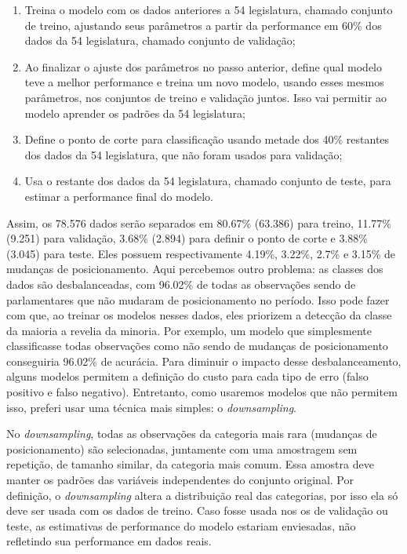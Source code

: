 \documentclass[a4paper,titlepage]{ppgi}\usepackage[]{graphicx}\usepackage[]{color}
\begin{document}
\begin{enumerate}
\item Treina o modelo com os dados anteriores a 54\textordfeminine{}
legislatura, chamado conjunto de treino, ajustando seus parâmetros a partir
da performance em 60\% dos dados da 54\textordfeminine{} legislatura, chamado
conjunto de validação;
\item Ao finalizar o ajuste dos parâmetros no passo anterior, define qual
modelo teve a melhor performance e treina um novo modelo, usando esses mesmos
parâmetros, nos conjuntos de treino e validação juntos. Isso vai permitir ao
modelo aprender os padrões da 54\textordfeminine{} legislatura;
\item Define o ponto de corte para classificação usando metade dos 40\%
restantes dos dados da 54\textordfeminine{} legislatura, que não foram usados
para validação;
\item Usa o restante dos dados da 54\textordfeminine{} legislatura, chamado
conjunto de teste, para estimar a performance final do modelo.
\end{enumerate}

Assim, os 78.576 dados serão separados em
80.67\%
(63.386) para treino,
11.77\%
(9.251) para validação,
3.68\%
(2.894) para definir o ponto de corte e
3.88\% (3.045) para
teste. Eles possuem respectivamente
4.19\%,
3.22\%,
2.7\% e
3.15\% de mudanças de posicionamento.
Aqui percebemos outro problema: as classes dos dados são desbalanceadas, com
96.02\% de todas as observações sendo de
parlamentares que não mudaram de posicionamento no período. Isso pode fazer com
que, ao treinar os modelos nesses dados, eles priorizem a detecção da classe da
maioria a revelia da minoria. Por exemplo, um modelo que simplesmente
classificasse todas observações como não sendo de mudanças de posicionamento
conseguiria 96.02\% de acurácia.  Para
diminuir o impacto desse desbalanceamento, alguns modelos permitem a definição
do custo para cada tipo de erro (falso positivo e falso negativo). Entretanto,
como usaremos modelos que não permitem isso, preferi usar uma técnica mais
simples: o \emph{downsampling}.

No \emph{downsampling}, todas as observações da categoria mais rara (mudanças de
posicionamento) são selecionadas, juntamente com uma amostragem sem repetição,
de tamanho similar, da categoria mais comum. Essa amostra deve manter os padrões
das variáveis independentes do conjunto original. Por definição, o
\emph{downsampling} altera a distribuição real das categorias, por isso ela só
deve ser usada com os dados de treino. Caso fosse usada nos os de validação ou
teste, as estimativas de performance do modelo estariam enviesadas, não
refletindo sua performance em dados reais.
\end{document}
